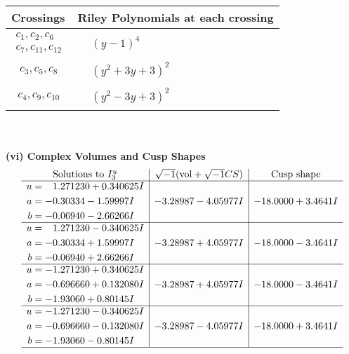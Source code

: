 \documentclass[1p]{elsarticle_modified}
\theoremstyle{definition}
\newcommand{\I}{\sqrt{-1}}
\begin{document}
\begin{tabular}{m{50pt}|m{274pt}}
Crossings & \hspace{64pt}Riley Polynomials at each crossing \\
\hline $$\begin{aligned}c_{1},c_{2},c_{6}\\c_{7},c_{11},c_{12}\end{aligned}$$&$\begin{aligned}
&(y-1)^4
\end{aligned}$\\
\hline $$\begin{aligned}c_{3},c_{5},c_{8}\end{aligned}$$&$\begin{aligned}
&(y^2+3 y+3)^2
\end{aligned}$\\
\hline $$\begin{aligned}c_{4},c_{9},c_{10}\end{aligned}$$&$\begin{aligned}
&(y^2-3 y+3)^2
\end{aligned}$\\
\hline
\end{tabular}\\~\\
\newpage\flushleft \textbf{(vi) Complex Volumes and Cusp Shapes}
$$\begin{array}{c|c|c}  
\text{Solutions to }I^u_{3}& \I (\text{vol} + \sqrt{-1}CS) & \text{Cusp shape}\\
 \hline 
\begin{aligned}
u &= \phantom{-}1.271230 + 0.340625 I \\
a &= -0.30334 - 1.59997 I \\
b &= -0.06940 - 2.66266 I\end{aligned}
 & -3.28987 - 4.05977 I & -18.0000 + 3.4641 I \\ \hline\begin{aligned}
u &= \phantom{-}1.271230 - 0.340625 I \\
a &= -0.30334 + 1.59997 I \\
b &= -0.06940 + 2.66266 I\end{aligned}
 & -3.28987 + 4.05977 I & -18.0000 - 3.4641 I \\ \hline\begin{aligned}
u &= -1.271230 + 0.340625 I \\
a &= -0.696660 + 0.132080 I \\
b &= -1.93060 + 0.80145 I\end{aligned}
 & -3.28987 + 4.05977 I & -18.0000 - 3.4641 I \\ \hline\begin{aligned}
u &= -1.271230 - 0.340625 I \\
a &= -0.696660 - 0.132080 I \\
b &= -1.93060 - 0.80145 I\end{aligned}
 & -3.28987 - 4.05977 I & -18.0000 + 3.4641 I\\
 \hline 
 \end{array}$$\newpage\newpage\renewcommand{\arraystretch}{1}
\end{document}
